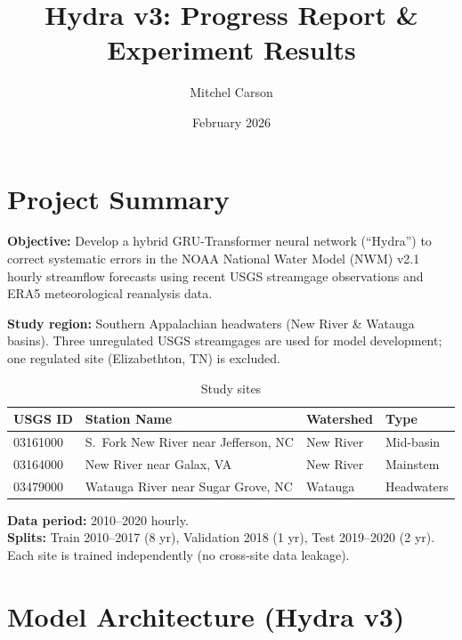 \documentclass[11pt]{article}
\title{Hydra v3: Progress Report \& Experiment Results}
\author{Mitchel Carson}
\date{February 2026}
\begin{document}
\maketitle

\section{Project Summary}

\textbf{Objective:} Develop a hybrid GRU-Transformer neural network (``Hydra'') to correct systematic errors in the NOAA National Water Model (NWM) v2.1 hourly streamflow forecasts using recent USGS streamgage observations and ERA5 meteorological reanalysis data.

\textbf{Study region:} Southern Appalachian headwaters (New River \& Watauga basins). Three unregulated USGS streamgages are used for model development; one regulated site (Elizabethton, TN) is excluded.

\begin{table}[h]
\centering
\caption{Study sites}
\begin{tabular}{llll}
\toprule
\textbf{USGS ID} & \textbf{Station Name} & \textbf{Watershed} & \textbf{Type} \\
\midrule
03161000 & S.\ Fork New River near Jefferson, NC & New River & Mid-basin \\
03164000 & New River near Galax, VA & New River & Mainstem \\
03479000 & Watauga River near Sugar Grove, NC & Watauga & Headwaters \\
\bottomrule
\end{tabular}
\end{table}

\textbf{Data period:} 2010--2020 hourly. \\
\textbf{Splits:} Train 2010--2017 (8 yr), Validation 2018 (1 yr), Test 2019--2020 (2 yr). \\
Each site is trained independently (no cross-site data leakage).

\section{Model Architecture (Hydra v3)}
\end{document}
